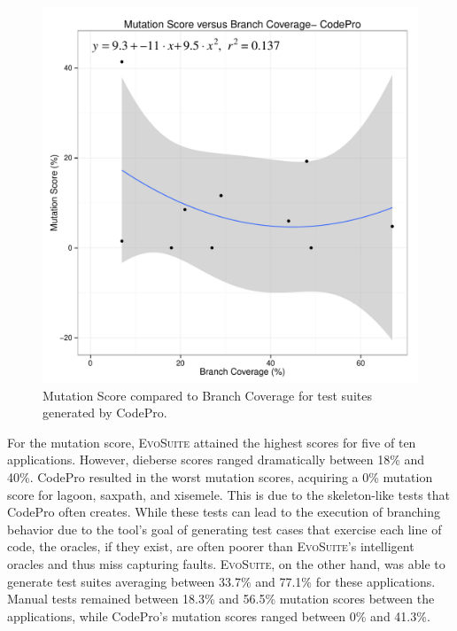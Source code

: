\begin{figure}[!t]
\centering
  \includegraphics[width=\linewidth]{RGraphs/CodePro_BranchCov_versus_Mutation_poly.pdf}
    \caption{Mutation Score compared to Branch Coverage for test suites generated by CodePro.}
  \label{fig:CP_branch_mutation}
\end{figure}
For the mutation score, \textsc{EvoSuite} attained the highest scores for five of ten applications. However, dieberse scores ranged dramatically between 18\% and 40\%.  CodePro resulted in the worst mutation scores, acquiring a  0\% mutation score for lagoon, saxpath, and xisemele. This is due to the skeleton-like tests that CodePro often creates.  While these tests can lead to the execution of branching behavior due to the tool's goal of generating test cases that exercise each line of code, the oracles, if they exist, are often poorer than \textsc{EvoSuite}'s intelligent oracles and thus miss capturing faults. \textsc{EvoSuite}, on the other hand, was able to generate test suites averaging between 33.7\% and 77.1\% for these applications. Manual tests remained between 18.3\% and 56.5\%  mutation scores between the applications, while CodePro's mutation scores ranged between 0\% and 41.3\%. 

